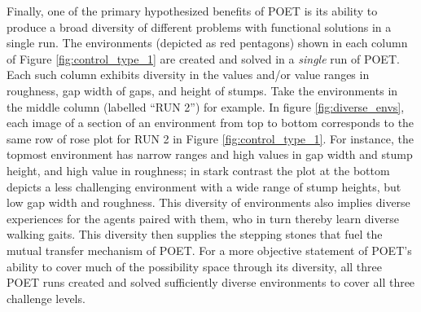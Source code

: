 \documentclass{article}
\newcommand{\jc}[1]{\comments{\textcolor{deepForestGreen}{[JC: #1]}}}
\newcommand{\comments}[1]{#1}
\begin{document}
Finally, one of the primary hypothesized benefits of POET is its ability to produce a broad diversity of different problems with functional solutions in a single run. The environments (depicted as red pentagons) shown in each column of Figure \ref{fig:control_type_1} are created and solved in a \emph{single} run of POET. 
Each such column exhibits  diversity in the values and/or value ranges in roughness, gap width of gaps, and height of stumps. Take the environments in the middle column (labelled ``RUN 2'') for example. In figure \ref{fig:diverse_envs},
each image of a section of an environment from top to bottom corresponds to the same row of rose plot for RUN 2 in Figure \ref{fig:control_type_1}.
For instance, the topmost environment has narrow ranges and high values in gap width and stump height, and high value in roughness; in stark contrast the plot at the bottom depicts a less challenging environment with a wide range of stump heights, but low gap width and roughness.  
This diversity of environments also implies diverse experiences for the agents paired with them, who in turn thereby learn diverse walking gaits.  This diversity then supplies the stepping stones that fuel the mutual transfer mechanism of POET.
For a more objective statement of POET's ability to cover much of the possibility space through its diversity, all three POET runs created and solved sufficiently diverse environments to cover all three challenge levels.
\end{document}
